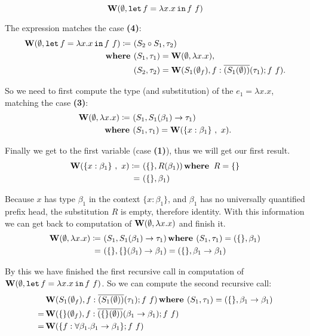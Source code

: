 \documentclass[a4paper,oneside]{memoir}
\begin{document}
$$\operatorname{\textbf{W}}(\emptyset, \texttt{let} \, f = \lambda x . x \, \texttt{in} \, f~f)$$

The expression matches the case \textbf{(4)}:
\begin{align*}
\operatorname{\textbf{W}}(\emptyset, \texttt{let} \, f = \lambda x . x \, \texttt{in} \, f~f) \coloneqq ~ & (S_2 \circ S_1, \tau_2) \\
\operatorname{\textbf{where~}} & (S_1, \tau_1) = \operatorname{\textbf{W}}(\emptyset, \lambda x . x), \\
       & (S_2, \tau_2) = \operatorname{\textbf{W}}(S_1(\emptyset_f),f:\overline{(S_1(\emptyset))}(\tau_1); f~f).
\end{align*}

So we need to first compute the type (and substitution) of the $e_1 = \lambda x . x$, matching the case \textbf{(3)}:
\begin{align*}
\operatorname{\textbf{W}}(\emptyset, \lambda x .x) \coloneqq ~ & (S_1, S_1(\beta_1) \rightarrow \tau_1 ) \\
\operatorname{\textbf{where~}} & (S_1, \tau_1) = \operatorname{\textbf{W}}(\{x : \beta_1 \}~,~ x).
\end{align*}

Finally we get to the first variable (case \textbf{(1)}), thus we will get our first result.
\begin{align*}
\operatorname{\textbf{W}}(\{x : \beta_1 \}~,~ x) \coloneqq ~ & ( \{\}, R(\beta_1) ) \operatorname{\textbf{where~}}  R = \{\} \\
                              = ~ & ( \{\}, \beta_1 )
\end{align*}

Because $x$ has type $\beta_1$ in the context $\{x : \beta_1\}$, and $\beta_1$ has no universally quantified prefix head, the substitution $R$ is empty, therefore identity. With this information we can get back to computation of $\operatorname{\textbf{W}}(\emptyset, \lambda x .x)$ and finish it. 
\begin{align*}
\operatorname{\textbf{W}}(\emptyset, \lambda x . x) \coloneqq ~ & (S_1, S_1(\beta_1) \rightarrow \tau_1 ) \operatorname{\textbf{where~}} (S_1, \tau_1) = ( \{\}, \beta_1 ) \\
 = ~ & (\{\}, \{\}(\beta_1) \rightarrow \beta_1 ) = (\{\}, \beta_1 \rightarrow \beta_1 )
\end{align*}

By this we have finished the first recursive call in computation of \\
$\operatorname{\textbf{W}}(\emptyset, \texttt{let} \, f = \lambda x . x \, \texttt{in} \, f~f)$. So we can compute the second recursive call:
\begin{align*}
& \operatorname{\textbf{W}}(S_1(\emptyset_f),f:\overline{(S_1(\emptyset))}(\tau_1); f~f) \operatorname{\textbf{where~}} (S_1, \tau_1) = (\{\}, \beta_1 \rightarrow \beta_1 ) \\
= & \operatorname{\textbf{W}}(\{\}(\emptyset_f),f:\overline{(\{\}(\emptyset))}(\beta_1 \rightarrow \beta_1); f~f) \\
= & \operatorname{\textbf{W}}(\{f:\forall \beta_1 . \beta_1 \rightarrow \beta_1 \}; f~f)
\end{align*}
\end{document}
